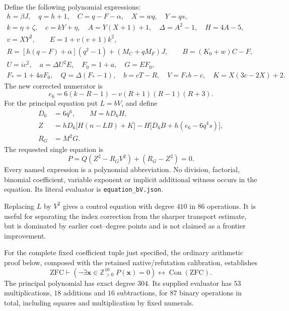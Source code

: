 Define the following polynomial expressions:
\begin{gather*}
 h=\beta J,\quad q=h+1,\quad C=q-F-\alpha,\quad X=wq,\quad Y=qs,\\
 k=\eta+\zeta,\quad c=kY+\eta,\quad
 A=Y(X+1)+1,\quad \Delta=A^2-1,\quad H=4A-5,\\
 v=XY^2,\qquad E=1+v(v+1)k^2,\\
 R=[h(q-F)+\alpha](q^2-1)+(M_C+qM_F)J,\qquad
 B=(K_0+w)C-F,\\
 U=ic^2,\quad a=\Delta U^2E,\quad F_0=1+a,\quad G=EF_0,\\
 F_*=1+4aF_0,\quad Q=\Delta(F_*-1),\quad
 b=cT-R,\quad V=F_*b-c,\quad K=X(3c-2X)+2.
\end{gather*}
The new corrected numerator is
\begin{equation}
 e_6=6(k-R-1)-v(R+1)(R-1)(R+3).
 \label{eq:lucas-e6}
\end{equation}
For the principal equation put $L=bV$, and define
\begin{align*}
 D_6&=6q^6,\qquad M=hD_6H,\\
 Z&=hD_6\bigl[H(n-LB)+K\bigr]
       -H\bigl[D_6B+h(e_6-6q^4s)\bigr],\\
 R_G&=M^2G.
\end{align*}
The requested single equation is
\begin{equation}
 \boxed{\;P=Q(Z^2-R_GV^2)+(R_G-Z^2)=0.\;}
 \label{eq:lucas-principal}
\end{equation}
Every named expression is a polynomial abbreviation.  No division, factorial,
binomial coefficient, variable exponent or implicit additional witness occurs
in the equation.  Its literal evaluator is \texttt{equation\_bV.json}.

Replacing $L$ by $V^2$ gives a control equation with degree $410$ in $86$
operations.  It is useful for separating the index correction from the sharper
transport estimate, but is dominated by earlier cost--degree points and is
not claimed as a frontier improvement.

\begin{theorem}
\label{thm:lucas-q1}
For the complete fixed coefficient tuple just specified, the ordinary
arithmetic proof below, composed with the retained native/refutation
calibration, establishes
\[
 \mathrm{ZFC}\vdash
 \left(\neg\exists\mathbf x\in\mathbb Z_{>0}^{10}\;
 P(\mathbf x)=0\right)\longleftrightarrow\operatorname{Con}(\mathrm{ZFC}).
\]
The principal polynomial has exact degree $304$.  Its supplied evaluator has
$53$ multiplications, $18$ additions and $16$ subtractions, for $87$ binary
operations in total, including squares and multiplication by fixed numerals.
\end{theorem}

